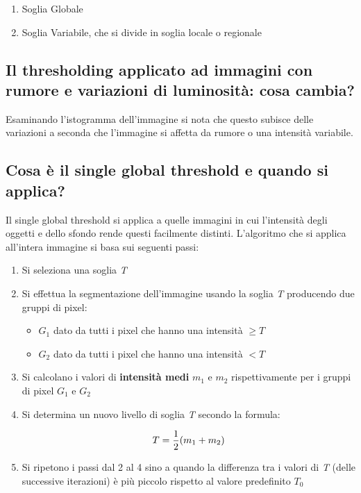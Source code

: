 \begin{enumerate}
\item Soglia Globale
\item Soglia Variabile, che si divide in soglia locale o regionale
\end{enumerate}

\subsection{Il thresholding applicato ad immagini con rumore e variazioni di luminosità: cosa cambia?}
Esaminando l'istogramma dell'immagine si nota che questo subisce delle variazioni a seconda che 
l'immagine si affetta da rumore o una intensità variabile.

\subsection{Cosa è il single global threshold e quando si applica?}
Il single global threshold si applica a quelle immagini in cui l'intensità degli oggetti e dello sfondo rende questi facilmente distinti. L'algoritmo che si applica all'intera immagine si basa sui seguenti passi:

\begin{enumerate}
\item Si seleziona una soglia \textit{T}
\item Si effettua la segmentazione dell'immagine usando la soglia \textit{T} producendo due gruppi di pixel:

\begin{itemize}
\item $G_1$ dato da tutti i pixel che hanno una intensità $\geq T$
\item $G_2$ dato da tutti i pixel che hanno una intensità $ < T$
\end{itemize}

\item Si calcolano i valori di \textbf{intensità medi} $m_1$ e $m_2$ rispettivamente per i gruppi di pixel $G_1$ e $G_2$
\item Si determina un nuovo livello di soglia \textit{T} secondo la formula:

$$
T = {1 \over 2} (m_1 + m_2)
$$

\item Si ripetono i passi dal 2 al 4 sino a quando la differenza tra i valori di \textit{T} (delle successive iterazioni) è più piccolo rispetto al valore predefinito $T_0$
\end{enumerate}

